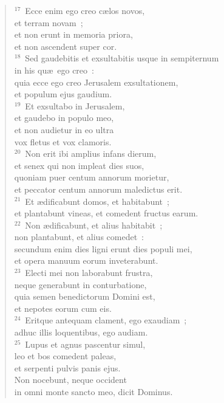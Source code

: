 \begin{verse}
${}^{17}$~Ecce enim ego creo c\ae los novos,\\ et terram novam~;\\ et non erunt in memoria priora,\\ et non ascendent super cor.\\
${}^{18}$~Sed gaudebitis et exsultabitis usque in sempiternum\\ in his qu\ae\ ego creo~:\\ quia ecce ego creo Jerusalem exsultationem,\\ et populum ejus gaudium.\\
${}^{19}$~Et exsultabo in Jerusalem,\\ et gaudebo in populo meo,\\ et non audietur in eo ultra\\ vox fletus et vox clamoris.\\
${}^{20}$~Non erit ibi amplius infans dierum,\\ et senex qui non impleat dies suos,\\ quoniam puer centum annorum morietur,\\ et peccator centum annorum maledictus erit.\\
${}^{21}$~Et \ae dificabunt domos, et habitabunt~;\\ et plantabunt vineas, et comedent fructus earum.\\
${}^{22}$~Non \ae dificabunt, et alius habitabit~;\\ non plantabunt, et alius comedet~:\\ secundum enim dies ligni erunt dies populi mei,\\ et opera manuum eorum inveterabunt.\\
${}^{23}$~Electi mei non laborabunt frustra,\\ neque generabunt in conturbatione,\\ quia semen benedictorum Domini est,\\ et nepotes eorum cum eis.\\
${}^{24}$~Eritque antequam clament, ego exaudiam~;\\ adhuc illis loquentibus, ego audiam.\\
${}^{25}$~Lupus et agnus pascentur simul,\\ leo et bos comedent paleas,\\ et serpenti pulvis panis ejus.\\ Non nocebunt, neque occident\\ in omni monte sancto meo, dicit Dominus.\end{verse}


